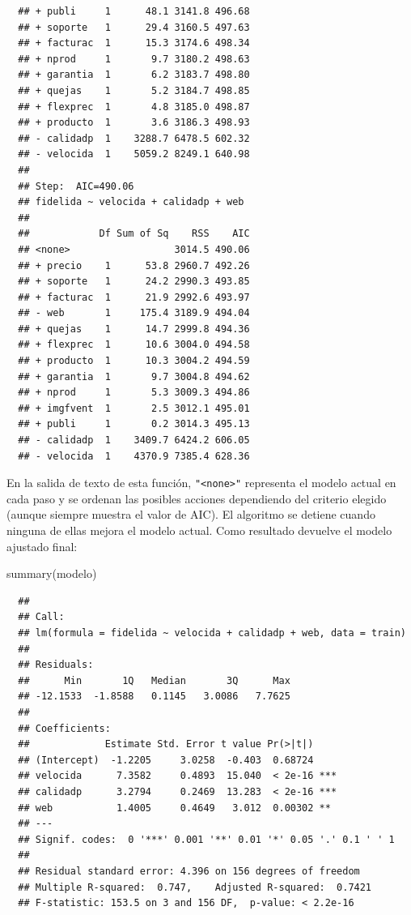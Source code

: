 \documentclass[
]{book}
\newenvironment{Shaded}{\begin{snugshade}}{\end{snugshade}}
\newcommand{\FunctionTok}[1]{\textcolor[rgb]{0.00,0.00,0.00}{#1}}
\newcommand{\NormalTok}[1]{#1}
\theoremstyle{break}
\theoremstyle{nonumberplain}
\begin{document}
\begin{verbatim}
  ## + publi     1      48.1 3141.8 496.68
  ## + soporte   1      29.4 3160.5 497.63
  ## + facturac  1      15.3 3174.6 498.34
  ## + nprod     1       9.7 3180.2 498.63
  ## + garantia  1       6.2 3183.7 498.80
  ## + quejas    1       5.2 3184.7 498.85
  ## + flexprec  1       4.8 3185.0 498.87
  ## + producto  1       3.6 3186.3 498.93
  ## - calidadp  1    3288.7 6478.5 602.32
  ## - velocida  1    5059.2 8249.1 640.98
  ## 
  ## Step:  AIC=490.06
  ## fidelida ~ velocida + calidadp + web
  ## 
  ##            Df Sum of Sq    RSS    AIC
  ## <none>                  3014.5 490.06
  ## + precio    1      53.8 2960.7 492.26
  ## + soporte   1      24.2 2990.3 493.85
  ## + facturac  1      21.9 2992.6 493.97
  ## - web       1     175.4 3189.9 494.04
  ## + quejas    1      14.7 2999.8 494.36
  ## + flexprec  1      10.6 3004.0 494.58
  ## + producto  1      10.3 3004.2 494.59
  ## + garantia  1       9.7 3004.8 494.62
  ## + nprod     1       5.3 3009.3 494.86
  ## + imgfvent  1       2.5 3012.1 495.01
  ## + publi     1       0.2 3014.3 495.13
  ## - calidadp  1    3409.7 6424.2 606.05
  ## - velocida  1    4370.9 7385.4 628.36
\end{verbatim}

En la salida de texto de esta función, \texttt{"\textless{}none\textgreater{}"} representa el modelo actual en cada paso y se ordenan las posibles acciones dependiendo del criterio elegido (aunque siempre muestra el valor de AIC).
El algoritmo se detiene cuando ninguna de ellas mejora el modelo actual.
Como resultado devuelve el modelo ajustado final:

\begin{Shaded}
\begin{Highlighting}[]
\FunctionTok{summary}\NormalTok{(modelo)}
\end{Highlighting}
\end{Shaded}

\begin{verbatim}
  ## 
  ## Call:
  ## lm(formula = fidelida ~ velocida + calidadp + web, data = train)
  ## 
  ## Residuals:
  ##      Min       1Q   Median       3Q      Max 
  ## -12.1533  -1.8588   0.1145   3.0086   7.7625 
  ## 
  ## Coefficients:
  ##             Estimate Std. Error t value Pr(>|t|)    
  ## (Intercept)  -1.2205     3.0258  -0.403  0.68724    
  ## velocida      7.3582     0.4893  15.040  < 2e-16 ***
  ## calidadp      3.2794     0.2469  13.283  < 2e-16 ***
  ## web           1.4005     0.4649   3.012  0.00302 ** 
  ## ---
  ## Signif. codes:  0 '***' 0.001 '**' 0.01 '*' 0.05 '.' 0.1 ' ' 1
  ## 
  ## Residual standard error: 4.396 on 156 degrees of freedom
  ## Multiple R-squared:  0.747,    Adjusted R-squared:  0.7421 
  ## F-statistic: 153.5 on 3 and 156 DF,  p-value: < 2.2e-16
\end{verbatim}
\end{document}
